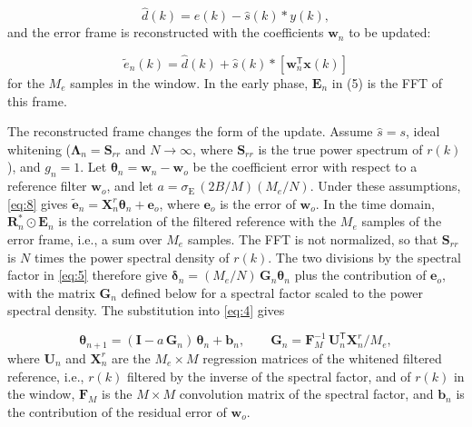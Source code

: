 \documentclass[sip,biber]{now-journal}
\begin{document}
\begin{equation}\label{eq:7}\hat{d}(k) = e(k) - \hat{s}(k) * y(k),\end{equation} and the error frame is reconstructed with the coefficients \(\mathbf{w}_n\) to be updated:

\begin{equation}\label{eq:8}\tilde{e}_n(k) = \hat{d}(k) + \hat{s}(k) * \left[\mathbf{w}_n^{\mathsf T}\mathbf{x}(k)\right]\end{equation} for the \(M_e\) samples in the window. In the early phase, \(\mathbf{E}_n\) in (5) is the FFT of this frame.

The reconstructed frame changes the form of the update. Assume \(\hat{s} = s\), ideal whitening (\(\boldsymbol{\Lambda}_n = \mathbf{S}_{rr}\) and \(N \to \infty\), where \(\mathbf{S}_{rr}\) is the true power spectrum of \(r(k)\)), and \(g_n = 1\). Let \(\boldsymbol{\theta}_n = \mathbf{w}_n - \mathbf{w}_o\) be the coefficient error with respect to a reference filter \(\mathbf{w}_o\), and let \(a = \sigma_{\mathrm E}\,(2B/M)(M_e/N)\). Under these assumptions, \eqref{eq:8} gives \(\tilde{\mathbf{e}}_n = \mathbf{X}^r_n \boldsymbol{\theta}_n + \mathbf{e}_o\), where \(\mathbf{e}_o\) is the error of \(\mathbf{w}_o\). In the time domain, \(\mathbf{R}_n^{*} \odot \mathbf{E}_n\) is the correlation of the filtered reference with the \(M_e\) samples of the error frame, i.e., a sum over \(M_e\) samples. The FFT is not normalized, so that \(\mathbf{S}_{rr}\) is \(N\) times the power spectral density of \(r(k)\). The two divisions by the spectral factor in \eqref{eq:5} therefore give \(\boldsymbol{\delta}_n = (M_e/N)\,\mathbf{G}_n\boldsymbol{\theta}_n\) plus the contribution of \(\mathbf{e}_o\), with the matrix \(\mathbf{G}_n\) defined below for a spectral factor scaled to the power spectral density. The substitution into \eqref{eq:4} gives

\begin{equation}\label{eq:9}\boldsymbol{\theta}_{n+1} = (\mathbf{I} - a\,\mathbf{G}_n)\,\boldsymbol{\theta}_n + \mathbf{b}_n, \qquad \mathbf{G}_n = \mathbf{F}_M^{-1}\,\mathbf{U}_n^{\mathsf T}\mathbf{X}^{r}_n / M_e,\end{equation} where \(\mathbf{U}_n\) and \(\mathbf{X}^r_n\) are the \(M_e \times M\) regression matrices of the whitened filtered reference, i.e., \(r(k)\) filtered by the inverse of the spectral factor, and of \(r(k)\) in the window, \(\mathbf{F}_M\) is the \(M \times M\) convolution matrix of the spectral factor, and \(\mathbf{b}_n\) is the contribution of the residual error of \(\mathbf{w}_o\).
\end{document}
